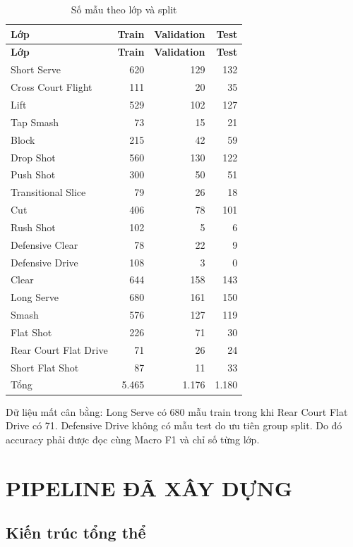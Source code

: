 \documentclass[12pt,a4paper,oneside]{report}
\begin{document}
\begin{longtable}{p{5.2cm}rrr}
\caption{Số mẫu theo lớp và split}\\
\toprule
\textbf{Lớp} & \textbf{Train} & \textbf{Validation} & \textbf{Test}\\
\midrule
\endfirsthead
\toprule
\textbf{Lớp} & \textbf{Train} & \textbf{Validation} & \textbf{Test}\\
\midrule
\endhead
Short Serve & 620 & 129 & 132\\
Cross Court Flight & 111 & 20 & 35\\
Lift & 529 & 102 & 127\\
Tap Smash & 73 & 15 & 21\\
Block & 215 & 42 & 59\\
Drop Shot & 560 & 130 & 122\\
Push Shot & 300 & 50 & 51\\
Transitional Slice & 79 & 26 & 18\\
Cut & 406 & 78 & 101\\
Rush Shot & 102 & 5 & 6\\
Defensive Clear & 78 & 22 & 9\\
Defensive Drive & 108 & 3 & 0\\
Clear & 644 & 158 & 143\\
Long Serve & 680 & 161 & 150\\
Smash & 576 & 127 & 119\\
Flat Shot & 226 & 71 & 30\\
Rear Court Flat Drive & 71 & 26 & 24\\
Short Flat Shot & 87 & 11 & 33\\
\midrule
Tổng & 5.465 & 1.176 & 1.180\\
\bottomrule
\end{longtable}

Dữ liệu mất cân bằng: Long Serve có 680 mẫu train trong khi Rear Court Flat Drive có 71. Defensive Drive không có mẫu test do ưu tiên group split. Do đó accuracy phải được đọc cùng Macro F1 và chỉ số từng lớp.

\chapter{PIPELINE ĐÃ XÂY DỰNG}
\section{Kiến trúc tổng thể}
\end{document}
